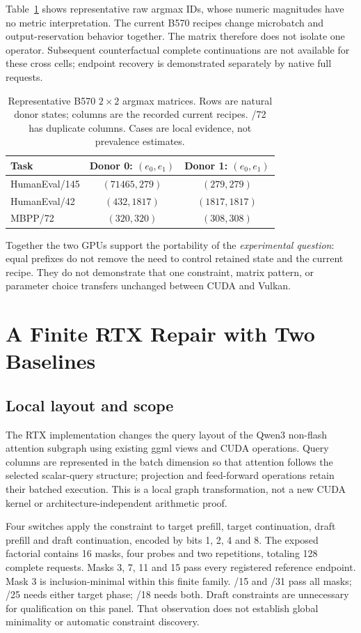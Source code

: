\documentclass{article}
\begin{document}
Table~\ref{tab:cross} shows representative raw argmax IDs, whose numeric magnitudes have no metric interpretation. The current B570 recipes change microbatch and output-reservation behavior together. The matrix therefore does not isolate one operator. Subsequent counterfactual complete continuations are not available for these cross cells; endpoint recovery is demonstrated separately by native full requests.

\begin{table}[t]
\centering\footnotesize\setlength{\tabcolsep}{3pt}
\caption{Representative B570 $2\times2$ argmax matrices. Rows are natural donor states; columns are the recorded current recipes. /72 has duplicate columns. Cases are local evidence, not prevalence estimates.}
\label{tab:cross}
\begin{tabular}{lcc}\toprule
Task & Donor 0: $(e_0,e_1)$ & Donor 1: $(e_0,e_1)$\\\midrule
HumanEval/145 & $(71465,279)$ & $(279,279)$\\
HumanEval/42 & $(432,1817)$ & $(1817,1817)$\\
MBPP/72 & $(320,320)$ & $(308,308)$\\\bottomrule
\end{tabular}
\end{table}

Together the two GPUs support the portability of the \emph{experimental question}: equal prefixes do not remove the need to control retained state and the current recipe. They do not demonstrate that one constraint, matrix pattern, or parameter choice transfers unchanged between CUDA and Vulkan.

\section{A Finite RTX Repair with Two Baselines}
\subsection{Local layout and scope}
The RTX implementation changes the query layout of the Qwen3 non-flash attention subgraph using existing ggml views and CUDA operations. Query columns are represented in the batch dimension so that attention follows the selected scalar-query structure; projection and feed-forward operations retain their batched execution. This is a local graph transformation, not a new CUDA kernel or architecture-independent arithmetic proof.

Four switches apply the constraint to target prefill, target continuation, draft prefill and draft continuation, encoded by bits 1, 2, 4 and 8. The exposed factorial contains 16 masks, four probes and two repetitions, totaling 128 complete requests. Masks 3, 7, 11 and 15 pass every registered reference endpoint. Mask 3 is inclusion-minimal within this finite family. /15 and /31 pass all masks; /25 needs either target phase; /18 needs both. Draft constraints are unnecessary for qualification on this panel. That observation does not establish global minimality or automatic constraint discovery.
\end{document}

